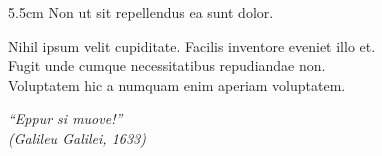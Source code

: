 \documentclass[
	12pt,				%
	oneside,			%
	a4paper,			%
	chapter=TITLE,		%
	section=TITLE,		%
	english,			%
	brazil				%
	]{abntex2}
\begin{document}
\begin{folhadeaprovacao}
	\vspace*{\fill}
	\centering
\end{folhadeaprovacao}

\begin{dedicatoria}
	\vspace*{\fill}
	\noindent
	\begin{adjustwidth*}{}{5.5cm}
		\raggedleft
		Non ut sit repellendus ea sunt dolor.
	\end{adjustwidth*}
\end{dedicatoria}

\begin{agradecimentos}
	Nihil ipsum velit cupiditate. Facilis inventore eveniet illo et.\\
Fugit unde cumque necessitatibus repudiandae non.\\
Voluptatem hic a numquam enim aperiam voluptatem.
\end{agradecimentos}

\begin{epigrafe}
	\vspace*{\fill}
	\begin{flushright}
		\textit{``Eppur si muove!''\\
(Galileu Galilei, 1633)}
	\end{flushright}
\end{epigrafe}

\end{document}
